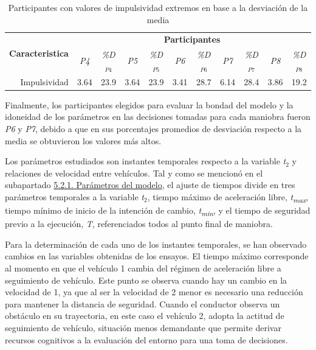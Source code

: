 \newpage
\begin{table}[h]
\renewcommand{\arraystretch}{1.5} %
\centering
\begin{tabular}{@{}ccccccccccc@{}}
 \multirow{2}{*}{\textbf{Caracteristica}} & \multicolumn{10}{c}{\textbf{Participantes}} \\ \cline{2-11}  & \textit{P4}              & \multicolumn{1}{c|}{\textit{\%D$_{P4}$}} & \textit{P5}              & \multicolumn{1}{c|}{\textit{\%D$_{P5}$}} & \textit{P6}              & \multicolumn{1}{c|}{\textit{\%D$_{P6}$}} & \textit{P7}              & \multicolumn{1}{c|}{\textit{\%D$_{P7}$}} & \textit{P8}              & \textit{\%D$_{P8}$} \\ \midrule
\multicolumn{1}{r}{Impulsividad}            & 3.64                     & \multicolumn{1}{c|}{23.9} & 3.64 & \multicolumn{1}{c|}{23.9} & 3.41 & \multicolumn{1}{c|}{28.7} & 6.14 & \multicolumn{1}{c|}{28.4} & 3.86 & 19.2 \\ \hline
\end{tabular}
\caption{Participantes con valores de impulsividad extremos en base a la desviación de la media}
\label{tab:5.6}
\end{table}

Finalmente, los participantes elegidos para evaluar la bondad del modelo y la idoneidad de los parámetros en las decisiones tomadas para cada maniobra fueron \emph{P6} y \emph{P7}, debido a que en sus porcentajes promedios de desviación respecto a la media se obtuvieron los valores más altos.

Los parámetros estudiados son instantes temporales respecto a la variable \emph{t$_2$} y relaciones de velocidad entre vehículos. Tal y como se mencionó en el subapartado \hyperref[521]{5.2.1. Parámetros del modelo}, el ajuste de tiempos divide en tres parámetros temporales a la variable \emph{t$_2$}, tiempo máximo de aceleración libre, \emph{t\textsubscript{max}}, tiempo mínimo de inicio de la intención de cambio, \emph{t\textsubscript{min}}, y el tiempo de seguridad previo a la ejecución, \emph{T}, referenciados todos al punto final de maniobra.

Para la determinación de cada uno de los instantes temporales, se han observado cambios en las variables obtenidas de los ensayos. El tiempo máximo corresponde al momento en que el vehículo 1 cambia del régimen de aceleración libre a seguimiento de vehículo. Este punto se observa cuando hay un cambio en la velocidad de 1, ya que al ser la velocidad de 2 menor es necesario una reducción para mantener la distancia de seguridad. Cuando el conductor observa un obstáculo en su trayectoria, en este caso el vehículo 2, adopta la actitud de seguimiento de vehículo, situación menos demandante que permite derivar recursos cognitivos a la evaluación del entorno para una toma de decisiones. 

